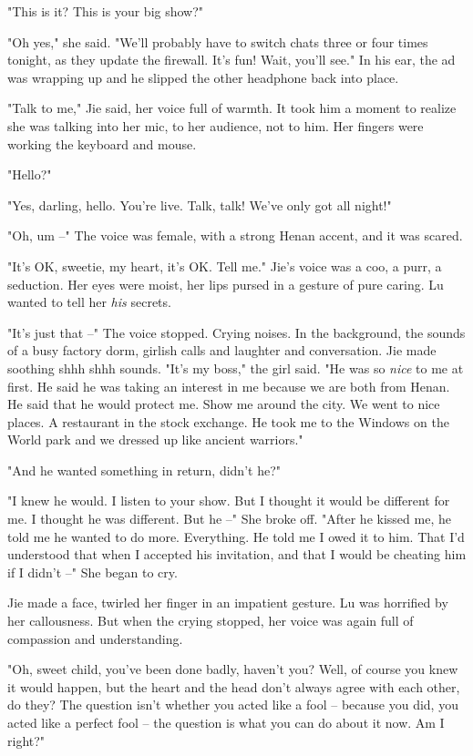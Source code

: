 "This is it? This is your big show?"

"Oh yes," she said. "We'll probably have to switch chats three or
four times tonight, as they update the firewall. It's fun! Wait,
you'll see." In his ear, the ad was wrapping up and he slipped the
other headphone back into place.

"Talk to me," Jie said, her voice full of warmth. It took him a
moment to realize she was talking into her mic, to her audience,
not to him. Her fingers were working the keyboard and mouse.

"Hello?"

"Yes, darling, hello. You're live. Talk, talk! We've only got all
night!"

"Oh, um --" The voice was female, with a strong Henan accent, and
it was scared.

"It's OK, sweetie, my heart, it's OK. Tell me." Jie's voice was a
coo, a purr, a seduction. Her eyes were moist, her lips pursed in a
gesture of pure caring. Lu wanted to tell her \emph{his} secrets.

"It's just that --" The voice stopped. Crying noises. In the
background, the sounds of a busy factory dorm, girlish calls and
laughter and conversation. Jie made soothing shhh shhh sounds.
"It's my boss," the girl said. "He was so \emph{nice} to me at
first. He said he was taking an interest in me because we are both
from Henan. He said that he would protect me. Show me around the
city. We went to nice places. A restaurant in the stock exchange.
He took me to the Windows on the World park and we dressed up like
ancient warriors."

"And he wanted something in return, didn't he?"

"I knew he would. I listen to your show. But I thought it would be
different for me. I thought he was different. But he --" She broke
off. "After he kissed me, he told me he wanted to do more.
Everything. He told me I owed it to him. That I'd understood that
when I accepted his invitation, and that I would be cheating him if
I didn't --" She began to cry.

Jie made a face, twirled her finger in an impatient gesture. Lu was
horrified by her callousness. But when the crying stopped, her
voice was again full of compassion and understanding.

"Oh, sweet child, you've been done badly, haven't you? Well, of
course you knew it would happen, but the heart and the head don't
always agree with each other, do they? The question isn't whether
you acted like a fool -- because you did, you acted like a perfect
fool -- the question is what you can do about it now. Am I right?"

